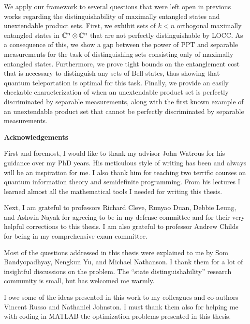 We apply our framework to several questions that were left open in previous works 
regarding the distinguishability  of maximally entangled states and unextendable product sets. 
First, we exhibit sets of $k < n$ orthogonal maximally entangled states in $\mathbb{C}^{n}\otimes\mathbb{C}^{n}$ 
that are not perfectly distinguishable by LOCC.
As a consequence of this, we show a gap between the power of PPT and separable measurements 
for the task of distinguishing sets consisting only of maximally entangled states.
Furthermore, we prove tight bounds on the entanglement cost that is necessary to
distinguish any sets of Bell states, thus showing that quantum teleportation is optimal for this task.
Finally, we provide an easily checkable characterization of when an unextendable product set is 
perfectly discriminated by separable measurements, along with the first known 
example of an unextendable product set that cannot be perfectly discriminated 
by separable measurements.

\cleardoublepage
\newpage


\begin{center}\textbf{Acknowledgements}\end{center}

First and foremost, I would like to thank my advisor John Watrous for his guidance
over my PhD years.
His meticulous style of writing has been and always will be an inspiration for me.  
I also thank him for teaching two terrific courses on quantum information theory 
and semidefinite programming. From his lectures I learned almost all the mathematical tools
I needed for writing this thesis.

Next, I am grateful to professors Richard Cleve, Runyao Duan, Debbie Leung, and Ashwin Nayak 
for agreeing to be in my defense committee and for their very helpful corrections to this thesis.
I am also grateful to professor Andrew Childs for being in my comprehensive exam committee.

Most of the questions addressed in this thesis were explained to me by Som Bandyopadhyay, 
Nengkun Yu, and Michael Nathanson. I thank them for a lot of insightful discussions on the problem.
The ``state distinguishability'' research community is small, but has welcomed me warmly.

I owe some of the ideas presented in this work to my colleagues and co-authors 
Vincent Russo and Nathaniel Johnston. I must thank them also for helping me
with coding in MATLAB the optimization problems presented in this thesis.

